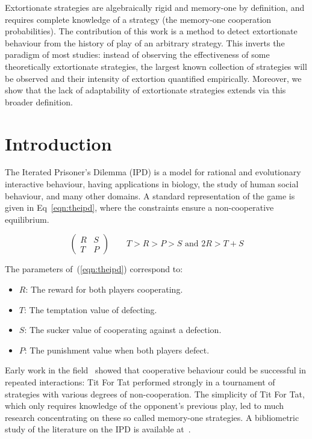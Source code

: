 \documentclass[10pt,letterpaper]{article}
\begin{document}
Extortionate strategies are algebraically rigid and memory-one by definition,
and requires complete knowledge of a strategy (the memory-one cooperation
probabilities). The contribution of this work is a method to detect
extortionate behaviour from the history of play of an arbitrary strategy. This inverts
the paradigm of most studies: instead of observing the effectiveness of some
theoretically extortionate strategies, the largest known collection of
strategies will be observed and their intensity of extortion quantified empirically.
Moreover, we show that the lack of adaptability of extortionate strategies
extends via this broader definition.


\linenumbers

\section*{Introduction}

The Iterated Prisoner's Dilemma (IPD) is a model for rational and evolutionary
interactive behaviour, having applications in biology, the study of human social
behaviour, and many other domains. A standard representation  of the game is
given in Eq~\ref{eqn:theipd}, where the constraints ensure a
non-cooperative equilibrium.

\begin{equation}
    \begin{pmatrix}
        R & S \\
        T & P
    \end{pmatrix}
    \qquad
    T > R > P > S\text{ and }2 R > T + S
    \label{eqn:theipd}
\end{equation}

The parameters of~(\ref{eqn:theipd}) correspond to:

\begin{itemize}
    \item \(R\): The reward for both players cooperating.
    \item \(T\): The temptation value of defecting.
    \item \(S\): The sucker value of cooperating against a defection.
    \item \(P\): The punishment value when both players defect.
\end{itemize}

Early work in the field~\cite{Axelrod1980, Axelrod1980a} showed that cooperative behaviour
could be successful in repeated interactions: Tit For Tat performed
strongly in a tournament of strategies with various degrees of non-cooperation.
The simplicity of Tit For Tat, which only requires knowledge of the
opponent's previous play, led to much research concentrating on these so called
memory-one strategies. A bibliometric study of the literature on the IPD is available
at~\cite{glynatsi2021bibliometric}.
\end{document}

